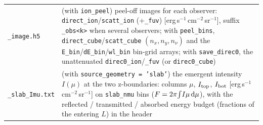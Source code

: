 \documentclass[english,a4paper]{my_memo}
\newcommand{\code}[1]{\texttt{#1}}
\begin{document}
\begin{center}
\begin{tabular}{lp{9.2cm}}
\code{\_image.h5} & (with \code{ion\_peel}) peel-off images for each observer: \code{direct\_ion}/\code{scatt\_ion} (+\code{\_fuv}) [erg\,s$^{-1}$\,cm$^{-2}$\,sr$^{-1}$], suffix \code{\_obs<k>} when several observers; with \code{peel\_bins}, \code{direct\_cube}/\code{scatt\_cube} $(n_x,n_y,n_\nu)$ and the \code{E\_bin}/\code{dE\_bin}/\code{wl\_bin} bin-grid arrays; with \code{save\_direc0}, the unattenuated \code{direc0\_ion}/\code{\_fuv} (or \code{direc0\_cube}) \\
\code{\_slab\_Imu.txt} & (with \code{source\_geometry\,=\,'slab'}) the emergent intensity $I(\mu)$ at the two z-boundaries: columns $\mu$, $I_{\rm top}$, $I_{\rm bot}$ [erg\,s$^{-1}$\,cm$^{-2}$\,sr$^{-1}$] on \code{slab\_nmu} bins ($F=2\pi\!\int\! I\mu\,{\rm d}\mu$), with the reflected / transmitted / absorbed energy budget (fractions of the entering $L$) in the header \\
\bottomrule
\end{tabular}
\end{center}
\label{sec:slabout}
\end{document}
